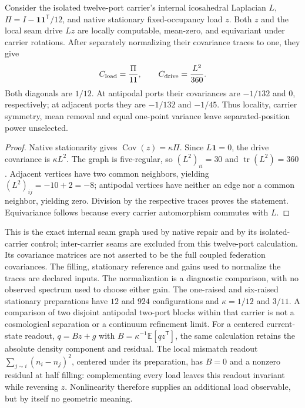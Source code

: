 \begin{proposition}
Consider the isolated twelve-port carrier's internal icosahedral Laplacian \(L\),
\(\Pi=I-\mathbf1\mathbf1^{\mathsf T}/12\), and native stationary
fixed-occupancy load \(z\). Both \(z\) and the local seam drive \(Lz\)
are locally computable, mean-zero, and equivariant under carrier rotations.
After separately normalizing their covariance traces to one, they give
\[
 C_{\rm load}=\frac{\Pi}{11},\qquad
 C_{\rm drive}=\frac{L^2}{360}.
\]
Both diagonals are \(1/12\). At antipodal ports their covariances are
\(-1/132\) and \(0\), respectively; at adjacent ports they are
\(-1/132\) and \(-1/45\). Thus locality, carrier symmetry, mean removal
and equal one-point variance leave separated-position power unselected.
\end{proposition}
\begin{proof}
Native stationarity gives \(\operatorname{Cov}(z)=\kappa\Pi\).
Since \(L\mathbf1=0\), the drive covariance is \(\kappa L^2\).
The graph is five-regular, so \((L^2)_{ii}=30\) and
\(\operatorname{tr}(L^2)=360\). Adjacent vertices have two common
neighbors, yielding \((L^2)_{ij}=-10+2=-8\); antipodal vertices have
neither an edge nor a common neighbor, yielding zero. Division by the
respective traces proves the statement. Equivariance follows because every
carrier automorphism commutes with \(L\).
\end{proof}

This is the exact internal seam graph used by native repair and by its
isolated-carrier control; inter-carrier seams are excluded from this
twelve-port calculation. Its covariance matrices are not asserted to be
the full coupled federation covariances. The filling, stationary reference
and gains used to normalize the traces are declared inputs. The normalization
is a diagnostic comparison, with no observed spectrum used to choose either gain. The one-raised
and six-raised stationary preparations have \(12\) and \(924\)
configurations and \(\kappa=1/12\) and \(3/11\). A comparison of two
disjoint antipodal two-port blocks within that carrier is not a
cosmological separation or a continuum refinement limit. For a
centered current-state readout,
\(q=Bz+g\) with \(B=\kappa^{-1}\mathbb E[qz^{\mathsf T}]\),
the same calculation retains the absolute density component and residual.
The local mismatch readout
\(\sum_{j\sim i}(n_i-n_j)^2\), centered under its preparation, has
\(B=0\) and a nonzero residual at half filling: complementing every load
leaves this readout invariant while reversing \(z\). Nonlinearity therefore
supplies an additional load observable, but by itself no geometric meaning.

